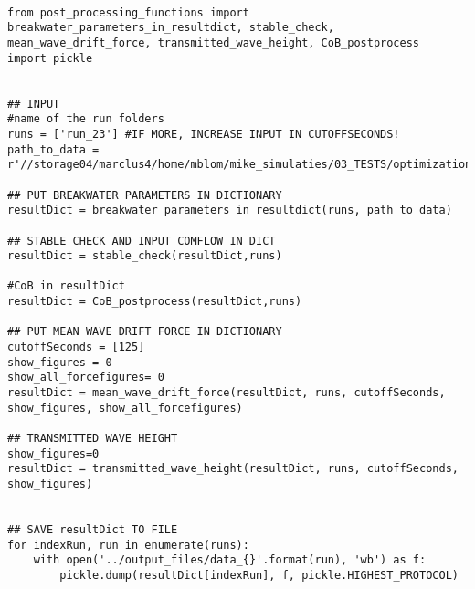 \begin{mdframed}[backgroundcolor=light-gray, roundcorner=10pt,leftmargin=1, rightmargin=1, innerleftmargin=0, innertopmargin=7,innerbottommargin=0, outerlinewidth=1, linecolor=light-gray]
\begin{lstlisting}[linewidth=\columnwidth,caption=Script that does the hydrodynamical post-processing ., label=script:hydro post processing]

from post_processing_functions import breakwater_parameters_in_resultdict, stable_check, mean_wave_drift_force, transmitted_wave_height, CoB_postprocess
import pickle


## INPUT
#name of the run folders
runs = ['run_23'] #IF MORE, INCREASE INPUT IN CUTOFFSECONDS!
path_to_data = r'//storage04/marclus4/home/mblom/mike_simulaties/03_TESTS/optimization_clusterfolder/ComFLOW_simulations_finished'

## PUT BREAKWATER PARAMETERS IN DICTIONARY
resultDict = breakwater_parameters_in_resultdict(runs, path_to_data)

## STABLE CHECK AND INPUT COMFLOW IN DICT
resultDict = stable_check(resultDict,runs)

#CoB in resultDict
resultDict = CoB_postprocess(resultDict,runs)

## PUT MEAN WAVE DRIFT FORCE IN DICTIONARY
cutoffSeconds = [125]
show_figures = 0
show_all_forcefigures= 0
resultDict = mean_wave_drift_force(resultDict, runs, cutoffSeconds, show_figures, show_all_forcefigures)

## TRANSMITTED WAVE HEIGHT
show_figures=0
resultDict = transmitted_wave_height(resultDict, runs, cutoffSeconds, show_figures)


## SAVE resultDict TO FILE
for indexRun, run in enumerate(runs):
    with open('../output_files/data_{}'.format(run), 'wb') as f:
        pickle.dump(resultDict[indexRun], f, pickle.HIGHEST_PROTOCOL)




\end{lstlisting}
\end{mdframed}


